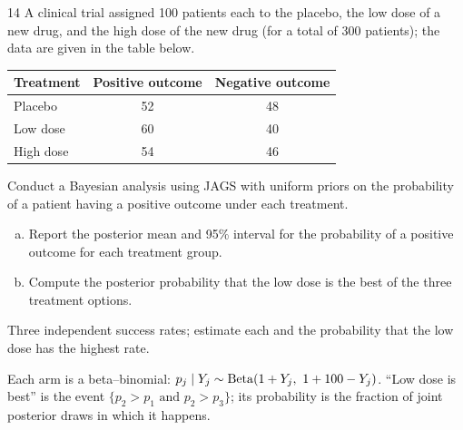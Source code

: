 \documentclass[11pt]{article}
\begin{document}

\begin{problem}{14}
A clinical trial assigned 100 patients each to the placebo, the low dose of a new drug, and the high dose of the new drug (for a total of 300 patients); the data are given in the table below.
\begin{center}
\begin{tabular}{lcc}\toprule
Treatment & Positive outcome & Negative outcome\\\midrule
Placebo & 52 & 48\\
Low dose & 60 & 40\\
High dose & 54 & 46\\\bottomrule
\end{tabular}
\end{center}
Conduct a Bayesian analysis using JAGS with uniform priors on the probability of a patient having a positive outcome under each treatment.
\begin{enumerate}[(a)]
\item Report the posterior mean and 95\% interval for the probability of a positive outcome for each treatment group.
\item Compute the posterior probability that the low dose is the best of the three treatment options.
\end{enumerate}
\end{problem}

\begin{restate}
Three independent success rates; estimate each and the probability that the low dose has the highest rate.
\end{restate}

\begin{keyidea}
Each arm is a beta--binomial: $p_j\mid Y_j\sim\mathrm{Beta}(1+Y_j,\ 1+100-Y_j)$. ``Low dose is best'' is the event $\{p_2>p_1\text{ and }p_2>p_3\}$; its probability is the fraction of joint posterior draws in which it happens.
\end{keyidea}
\end{document}
